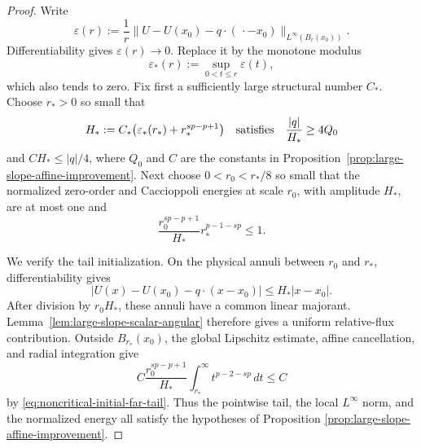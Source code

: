 \documentclass[11pt,reqno]{amsart}
\numberwithin{equation}{section}
\newcommand{\dd}{\,d}
\theoremstyle{remark}
\begin{document}
\begin{proof}
Write
\[
 \varepsilon(r):=\frac1r
 \|U-U(x_0)-q\cdot(\,\cdot-x_0)\|_{L^\infty(B_r(x_0))}.
\]
Differentiability gives \(\varepsilon(r)\to0\).  Replace it by the
monotone modulus
\[
 \varepsilon_*(r):=\sup_{0<t\le r}\varepsilon(t),
\]
which also tends to zero.  Fix first a sufficiently large structural
number \(C_*\).  Choose \(r_*>0\) so small that
\[
 H_*:=C_*\bigl(\varepsilon_*(r_*)+r_*^{sp-p+1}\bigr)
 \quad\hbox{satisfies}\quad
 \frac{|q|}{H_*}\ge4Q_0
\]
and \(CH_*\le |q|/4\), where \(Q_0\) and \(C\) are the constants in
Proposition~\ref{prop:large-slope-affine-improvement}.  Next choose
\(0<r_0<r_*/8\) so small that the normalized zero-order and Caccioppoli
energies at scale \(r_0\), with amplitude \(H_*\), are at most one and
\[
 \frac{r_0^{sp-p+1}}{H_*}
 r_*^{p-1-sp}\le1.
 \label{eq:noncritical-initial-far-tail}
\]

We verify the tail initialization.  On the physical annuli between
\(r_0\) and \(r_*\), differentiability gives
\[
 |U(x)-U(x_0)-q\cdot(x-x_0)|\le H_*|x-x_0|.
\]
After division by \(r_0H_*\), these annuli have a common linear
majorant.  Lemma~\ref{lem:large-slope-scalar-angular} therefore gives a
uniform relative-flux contribution.  Outside \(B_{r_*}(x_0)\), the
global Lipschitz estimate, affine cancellation, and radial integration
give
\[
 C\frac{r_0^{sp-p+1}}{H_*}
 \int_{r_*}^{\infty}t^{p-2-sp}\dd t
 \le C
\]
by \eqref{eq:noncritical-initial-far-tail}.  Thus the pointwise tail,
the local \(L^\infty\) norm, and the normalized energy all satisfy the
hypotheses of Proposition
\ref{prop:large-slope-affine-improvement}.


\end{proof}
\end{document}
